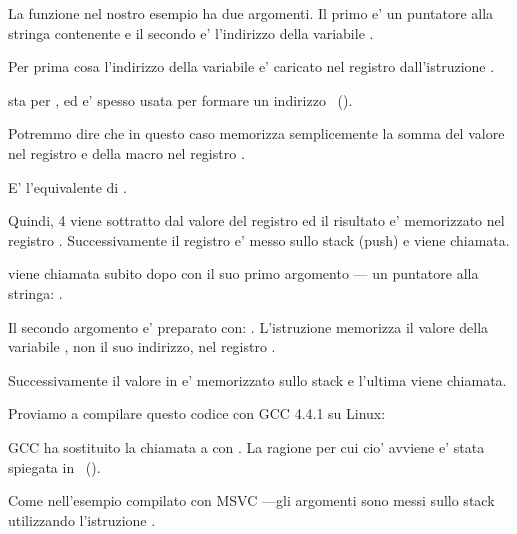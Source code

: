 La funzione \scanf nel nostro esempio ha due argomenti.
Il primo e' un puntatore alla stringa contenente  e il secondo e' l'indirizzo della variabile .

Per prima cosa l'indirizzo della variabile  e' caricato nel registro \EAX dall'istruzione .

\LEA sta per , ed e' spesso usata per formare un indirizzo ~().

Potremmo dire che in questo caso \LEA memorizza semplicemente la somma del valore nel registro \EBP e della macro  nel registro \EAX.

E' l'equivalente di .

Quindi, 4 viene sottratto dal valore del registro \EBP ed il risultato e' memorizzato nel registro \EAX.
Successivamente il registro \EAX e' messo sullo stack (push) e \scanf viene chiamata.

\printf viene chiamata subito dopo con il suo primo argomento --- un puntatore alla stringa:
.

Il secondo argomento e' preparato con: .
L'istruzione memorizza il valore della variabile ,  non il suo indirizzo, nel registro \ECX.

Successivamente il valore in \ECX e' memorizzato sullo stack e l'ultima \printf viene chiamata.




Proviamo a compilare questo codice con GCC 4.4.1 su Linux:



GCC ha sostituito la chiamata a \printf con \puts. La ragione per cui cio' avviene e' stata spiegata in ~().

% 

Come nell'esempio compilato con MSVC ---gli argomenti sono messi sullo stack utilizzando l'istruzione \MOV.


